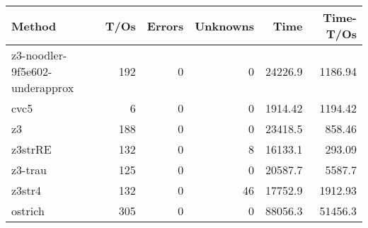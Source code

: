 \begin{tabular}{lrrrrr}
\hline
 Method                         &   T/Os &   Errors &   Unknowns &     Time &   Time-T/Os \\
\hline
 z3-noodler-9f5e602-underapprox &    192 &        0 &          0 & 24226.9  &     1186.94 \\
 cvc5                           &      6 &        0 &          0 &  1914.42 &     1194.42 \\
 z3                             &    188 &        0 &          0 & 23418.5  &      858.46 \\
 z3strRE                        &    132 &        0 &          8 & 16133.1  &      293.09 \\
 z3-trau                        &    125 &        0 &          0 & 20587.7  &     5587.7  \\
 z3str4                         &    132 &        0 &         46 & 17752.9  &     1912.93 \\
 ostrich                        &    305 &        0 &          0 & 88056.3  &    51456.3  \\
\hline
\end{tabular}
